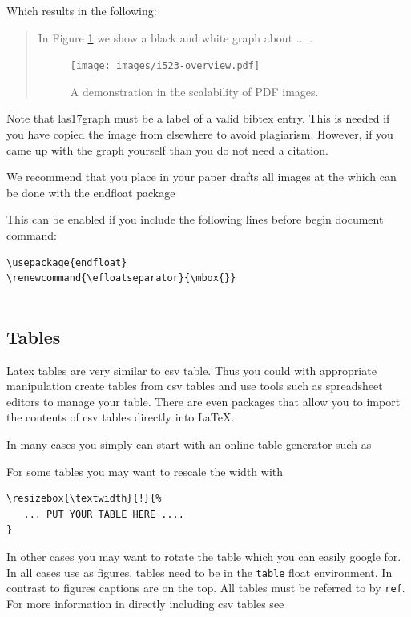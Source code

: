 Which results in the following:
\begin{quote}
In Figure \ref{F:flow} we show a black and white graph about ... .

\begin{figure}[htb]
  \texttt{[image: images/i523-overview.pdf]}
  \caption{A demonstration in the scalability of PDF images.}
  \label{F:flow}
\end{figure}
\end{quote}

Note that las17graph must be a label of a valid bibtex entry. This is
needed if you have copied the image from elsewhere to avoid plagiarism.
However, if you came up with the graph yourself than you do not need a
citation.

We recommend that you place in your paper drafts all images at the which
can be done with the endfloat package

This can be enabled if you include the following lines before begin
document command:

\begin{verbatim}
\usepackage{endfloat}
\renewcommand{\efloatseparator}{\mbox{}} 


\end{verbatim}

\subsection{Tables}\label{tables}

Latex tables are very similar to csv table. Thus you could with
appropriate manipulation create tables from csv tables and use tools
such as spreadsheet editors to manage your table. There are even
packages that allow you to import the contents of csv tables directly
into \LaTeX.

In many cases you simply can start with an online table generator such as


For some tables you may want to rescale the width with

\begin{verbatim}
\resizebox{\textwidth}{!}{%
   ... PUT YOUR TABLE HERE ....
}
\end{verbatim}

In other cases you may want to rotate the table which you can easily
google for. In all cases use as figures, tables need to be in the
\verb|table| float environment. In contrast to figures captions are on
the top. All tables must be referred to by \verb|ref|. For more
information in directly including csv tables see 

